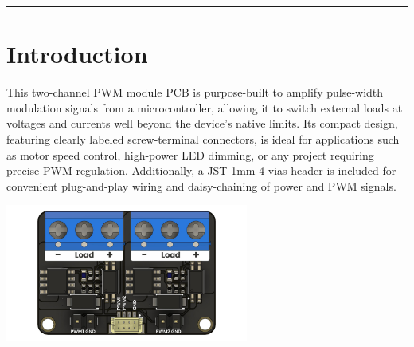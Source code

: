 \documentclass[10pt]{article}
\title{}
\author{}
\date{}
\begin{document}
\noindent
{}
\vspace{1em}
\hrule
\vspace{1.5em}

\section*{Introduction}
\vspace{0.5em}
\noindent
\begin{minipage}[t]{0.62\textwidth}
\setlength{\parskip}{0.75em}
\justifying
This two-channel PWM module PCB is purpose-built to amplify pulse-width modulation signals from a microcontroller, allowing it to switch external loads at voltages and currents well beyond the device’s native limits. Its compact design, featuring clearly labeled screw-terminal connectors, is ideal for applications such as motor speed control, high-power LED dimming, or any project requiring precise PWM regulation. Additionally, a JST 1mm 4 vias header is included for convenient plug-and-play wiring and daisy-chaining of power and PWM signals.
\end{minipage}
\hfill
\begin{minipage}[t]{0.35\textwidth}
\centering
\vspace{-0.5em}
\includegraphics[height=4.5cm,keepaspectratio]{./images/product.jpg}
\end{minipage}

\vspace{1.0em}
\FloatBarrier %
\end{document}
